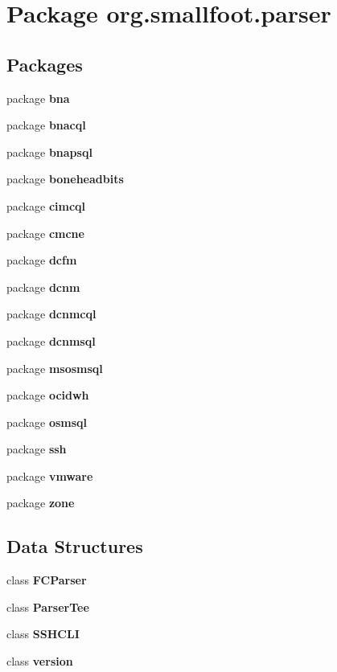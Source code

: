\section{Package org.\+smallfoot.\+parser}
\label{namespaceorg_1_1smallfoot_1_1parser}
\subsection*{Packages}
\begin{DoxyCompactItemize}
\item 
package {\bf bna}
\item 
package {\bf bnacql}
\item 
package {\bf bnapsql}
\item 
package {\bf boneheadbits}
\item 
package {\bf cimcql}
\item 
package {\bf cmcne}
\item 
package {\bf dcfm}
\item 
package {\bf dcnm}
\item 
package {\bf dcnmcql}
\item 
package {\bf dcnmsql}
\item 
package {\bf msosmsql}
\item 
package {\bf ocidwh}
\item 
package {\bf osmsql}
\item 
package {\bf ssh}
\item 
package {\bf vmware}
\item 
package {\bf zone}
\end{DoxyCompactItemize}
\subsection*{Data Structures}
\begin{DoxyCompactItemize}
\item 
class {\bf F\+C\+Parser}
\item 
class {\bf Parser\+Tee}
\item 
class {\bf S\+S\+H\+C\+L\+I}
\item 
class {\bf version}
\end{DoxyCompactItemize}
